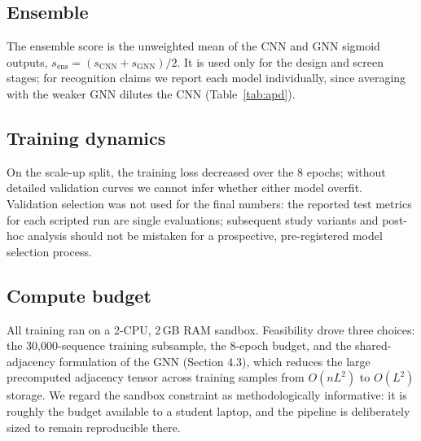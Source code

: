 \subsection{Ensemble}
The ensemble score is the unweighted mean of the CNN and GNN sigmoid outputs,
$s_{\text{ens}} = (s_{\text{CNN}} + s_{\text{GNN}})/2$. It is used only for
the design and screen stages; for recognition claims we report each model
individually, since averaging with the weaker GNN dilutes the CNN
(Table~\ref{tab:apd}).

\subsection{Training dynamics}
On the scale-up split, the training loss decreased over the 8 epochs; without detailed
validation curves we cannot infer whether either model overfit. Validation
selection was not used for the final numbers: the reported test metrics for each scripted run are single evaluations;
subsequent study variants and post-hoc analysis should not be mistaken for
a prospective, pre-registered model selection process.

\subsection{Compute budget}
All training ran on a 2-CPU, 2\,GB RAM sandbox. Feasibility drove three
choices: the 30{,}000-sequence training subsample, the 8-epoch budget, and
the shared-adjacency formulation of the GNN (Section 4.3), which reduces the large precomputed adjacency tensor across training
samples from $O(nL^2)$ to $O(L^2)$ storage. We regard the sandbox constraint as
methodologically informative: it is roughly the budget available to a
student laptop, and the pipeline is deliberately sized to remain reproducible
there.
